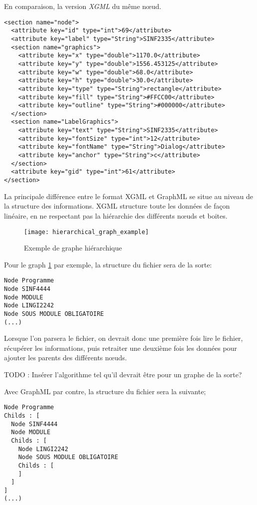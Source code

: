 En comparaison, la version \textit{XGML} du même nœud.
\begin{lstlisting}
<section name="node">
  <attribute key="id" type="int">69</attribute>
  <attribute key="label" type="String">SINF2335</attribute>
  <section name="graphics">
    <attribute key="x" type="double">1170.0</attribute>
    <attribute key="y" type="double">1556.453125</attribute>
    <attribute key="w" type="double">68.0</attribute>
    <attribute key="h" type="double">30.0</attribute>
    <attribute key="type" type="String">rectangle</attribute>
    <attribute key="fill" type="String">#FFCC00</attribute>
    <attribute key="outline" type="String">#000000</attribute>
  </section>
  <section name="LabelGraphics">
    <attribute key="text" type="String">SINF2335</attribute>
    <attribute key="fontSize" type="int">12</attribute>
    <attribute key="fontName" type="String">Dialog</attribute>
    <attribute key="anchor" type="String">c</attribute>
  </section>
  <attribute key="gid" type="int">61</attribute>
</section>
\end{lstlisting}

La principale différence entre le format XGML et GraphML se situe au niveau de la structure des informations. XGML structure toute les données de façon linéaire, en ne respectant pas la hiérarchie des différents nœuds et boites.

\begin{figure}[H]
\centering
\caption{Exemple de graphe hiérarchique} 
\label{fig:hierarchical_graph_example}
\texttt{[image: hierarchical\_graph\_example]}
\end{figure}

Pour le graph \ref{fig:hierarchical_graph_example} par exemple, la structure du fichier sera de la sorte:
\begin{lstlisting}
Node Programme
Node SINF4444
Node MODULE
Node LINGI2242
Node SOUS MODULE OBLIGATOIRE
(...)
\end{lstlisting}

Lorsque l'on parsera le fichier, on devrait donc une première fois lire le fichier, récupérer les informations, puis retraiter une deuxième fois les données pour ajouter les parents des différents nœuds.

TODO : Insérer l'algorithme tel qu'il devrait être pour un graphe de la sorte?

Avec GraphML par contre, la structure  du fichier sera la suivante;

\begin{lstlisting}
Node Programme
Childs : [
  Node SINF4444
  Node MODULE
  Childs : [
    Node LINGI2242
    Node SOUS MODULE OBLIGATOIRE
    Childs : [
    ]
  ]
]
(...)
\end{lstlisting}

